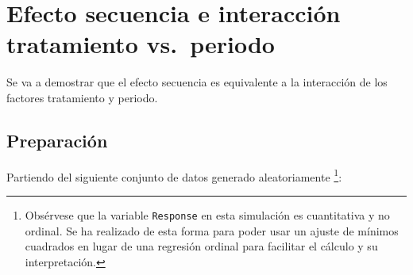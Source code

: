 \documentclass[
  12pt,
  a4paper,
  extrafontsizes,
  onecolumn,
  openright,
  table]{memoir}
\newenvironment{Shaded}{\begin{snugshade}}{\end{snugshade}}
\newcommand{\AttributeTok}[1]{\textcolor[rgb]{0.40,0.45,0.13}{#1}}
\newcommand{\ConstantTok}[1]{\textcolor[rgb]{0.56,0.35,0.01}{#1}}
\newcommand{\DecValTok}[1]{\textcolor[rgb]{0.68,0.00,0.00}{#1}}
\newcommand{\FunctionTok}[1]{\textcolor[rgb]{0.28,0.35,0.67}{#1}}
\newcommand{\NormalTok}[1]{\textcolor[rgb]{0.00,0.23,0.31}{#1}}
\newcommand{\OtherTok}[1]{\textcolor[rgb]{0.00,0.23,0.31}{#1}}
\newcommand{\SpecialCharTok}[1]{\textcolor[rgb]{0.37,0.37,0.37}{#1}}
\newcommand{\StringTok}[1]{\textcolor[rgb]{0.13,0.47,0.30}{#1}}
\begin{document}
\hypertarget{sec-contrasts}{%
\chapter{Efecto secuencia e interacción tratamiento
vs.~periodo}\label{sec-contrasts}}

Se va a demostrar que el \gls{efecto secuencia} es equivalente a la
interacción de los factores tratamiento y periodo.

\hypertarget{preparaciuxf3n}{%
\section{Preparación}\label{preparaciuxf3n}}

Partiendo del siguiente conjunto de datos generado aleatoriamente
\footnote{Obsérvese que la variable \texttt{Response} en esta simulación
  es cuantitativa y no ordinal. Se ha realizado de esta forma para poder
  usar un ajuste de mínimos cuadrados en lugar de una regresión ordinal
  para facilitar el cálculo y su interpretación.}: \scriptsize

\begin{Shaded}
\end{Shaded}
\end{document}
